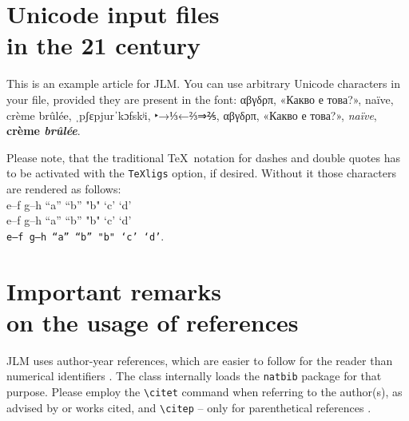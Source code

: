 \documentclass[
anonymous,
]{jlm}
\begin{document}


\maketitle              %

\begin{abstract}
  The abstract should summarise the contents of the paper in at least
  70 and at most 150 words.  The present paper has no scientific
  relevance and should be used as a practical example of text
  formatting for the Journal of Language Modelling.
\end{abstract}

\section{Unicode input files\\ in the 21 century}

This is an example article for JLM.  You can use arbitrary Unicode
characters in your file, provided they are present in the font:
αβγδρπ, «Какво е това?», naïve, crème brûlée, ˌpʃɛpjurˈkɔfskʲi,
‣→⅓←⅔⇒⅖, \textsf{αβγδρπ, «Какво е това?», \textit{naïve}, \textbf{crème \textit{brûlée}}}.

Please note, that the traditional \TeX\ notation for dashes and double
quotes has to be
activated with the \texttt{TeXligs} option, if desired.  Without it
those characters are rendered as follows:\\
e--f g–h ``a'' “b” "b" `c' ‘d’\\
\textsf{e--f g–h ``a'' “b” "b" `c' ‘d’}\\
\texttt{e--f g–h ``a'' “b” "b" `c' ‘d’}.



\section{Important remarks\\ on the usage of references}

JLM uses author-year references, which are easier to follow for the
reader than numerical identifiers \citep[cf.][]{fifak:sigma_rho}.  The
class internally loads the \texttt{natbib} package for that purpose.
Please employ the \verb+\citet+ command when referring to the
author(s), as advised by \citet{fifak:sigma_rho} or works cited, and
\verb+\citep+ – only for parenthetical references
\citep{fifak:sigma_rho}.
\end{document}
